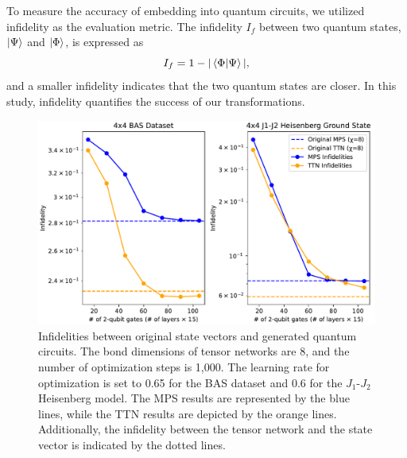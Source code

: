 \documentclass[12pt,dvipdfmx,twoside,openright]{report}
\begin{document}
To measure the accuracy of embedding into quantum circuits, we utilized infidelity as the evaluation metric.
The infidelity $I_f$ between two quantum states, $\ket{\Psi}$ and $\ket{\Phi}$, is expressed as
\begin{equation}
    I_f = 1 - |\braket{\Phi|\Psi}|,
\end{equation}
and a smaller infidelity indicates that the two quantum states are closer.
In this study, infidelity quantifies the success of our transformations.
 \begin{figure}
    \centering
    \includegraphics[width=\linewidth]{fig_ttn_mps.pdf}
    \caption{Infidelities between original state vectors and generated quantum circuits. The bond dimensions of tensor networks are 8, and the number of optimization steps is 1,000. The learning rate for optimization is set to 0.65 for the BAS dataset and 0.6 for the $J_1$-$J_2$ Heisenberg model. The MPS results are represented by the blue lines, while the TTN results are depicted by the orange lines. Additionally, the infidelity between the tensor network and the state vector is indicated by the dotted lines.}
    \label{fig:result1}
\end{figure}
 
\end{document}
